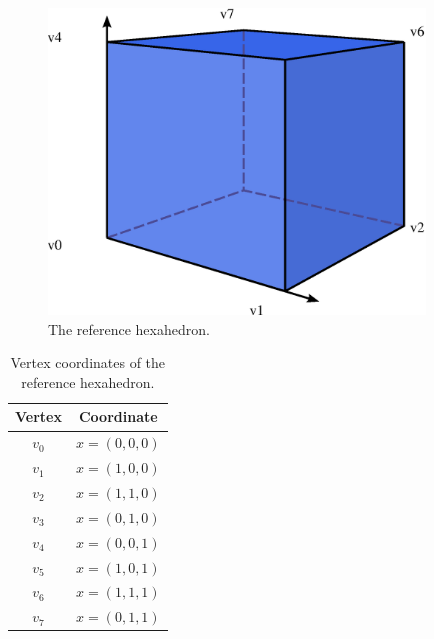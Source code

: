 \begin{figure}[H]
\linespread{1.2}\selectfont
  \begin{center}
    \includegraphics[width=10cm]{eps/hexahedron.eps}
    \caption{The reference hexahedron.}
    \label{fig:hexahedron}
  \end{center}
\end{figure}

\begin{table}[H]
\linespread{1.2}\selectfont
  \begin{center}
    \begin{tabular}{|c|c|}
      \hline
      Vertex & Coordinate \\
      \hline
      \hline
      $v_0$ & $x = (0, 0, 0)$ \\
      \hline
      $v_1$ & $x = (1, 0, 0)$ \\
      \hline
      $v_2$ & $x = (1, 1, 0)$ \\
      \hline
      $v_3$ & $x = (0, 1, 0)$ \\
      \hline
      $v_4$ & $x = (0, 0, 1)$ \\
      \hline
      $v_5$ & $x = (1, 0, 1)$ \\
      \hline
      $v_6$ & $x = (1, 1, 1)$ \\
      \hline
      $v_7$ & $x = (0, 1, 1)$ \\
      \hline
    \end{tabular}
    \caption{Vertex coordinates of the reference hexahedron.}
    \label{tab:hexahedron,vertices}
  \end{center}
\end{table}


